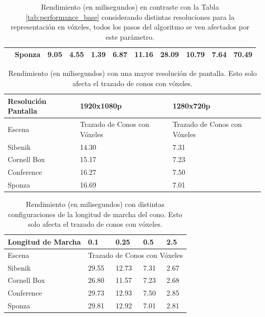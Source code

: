 \begin{table}[H]
\begin{tabular}{lllllllllll}
\multicolumn{1}{|l|}{}                     & \multicolumn{1}{l|}{Sponza}      & \multicolumn{1}{l|}{9.05}     & 4.55                                  & \multicolumn{1}{l|}{1.39}     & 6.87                         & \multicolumn{1}{l|}{11.16}     & 28.09                                 & \multicolumn{1}{l|}{10.79}     & \multicolumn{1}{l|}{7.64}            & \multicolumn{1}{l|}{70.49} \\ \hline
\end{tabular}
\captionsetup{justification=centering}
\caption{Rendimiento (en milisegundos) en contraste con la Tabla \ref{tab:performance_base} considerando distintas resoluciones para la representación en vóxeles, todos los pasos del algoritmo se ven afectados por este parámetro.}
\label{tab:performance_depth}
\end{table}
\begin{table}[H]
\centering
\begin{tabular}{|l|l|l|}
\hline
Resolución Pantalla  & 1920x1080p                    & 1280x720p                     \\ \hline
Escena      & Trazado de Conos con Vóxeles & Trazado de Conos con Vóxeles \\ \hline
Sibenik     & 14.30                        & 7.31                         \\
Cornell Box & 15.17                        & 7.23                         \\
Conference  & 16.27                        & 7.50                         \\
Sponza      & 16.69                        & 7.01                         \\ \hline
\end{tabular}
\captionsetup{justification=centering}
\caption{Rendimiento (en milisegundos) con una mayor resolución de pantalla. Esto solo afecta el trazado de conos con vóxeles.}
\label{tab:performance_display}
\end{table}
\begin{table}[H]
\centering
\begin{tabular}{|l|l|l|l|l|}
\hline
Longitud de Marcha & 0.1         & 0.25        & 0.5       & 2.5       \\ \hline
Escena             & \multicolumn{4}{l|}{Trazado de Conos con Vóxeles} \\ \hline
Sibenik            & 29.55       & 12.73       & 7.31      & 2.67      \\
Cornell Box        & 26.80       & 11.57       & 7.23      & 2.68      \\
Conference         & 29.73       & 12.93       & 7.50      & 2.85      \\
Sponza             & 29.81       & 12.92       & 7.01      & 2.81      \\ \hline\end{tabular}
\captionsetup{justification=centering}
\caption{Rendimiento (en milisegundos) con distintas configuraciones de la longitud de marcha del cono. Esto solo afecta el trazado de conos con vóxeles.}
\label{tab:performance_step}
\end{table}

